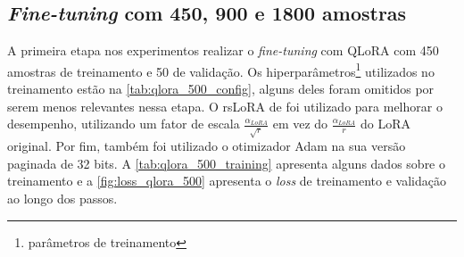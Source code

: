 \subsection{\textit{Fine-tuning} com 450, 900 e 1800 amostras}


A primeira etapa nos experimentos realizar o \textit{fine-tuning} com \ac{QLoRA} com 450 amostras de treinamento e 50 de validação. Os hiperparâmetros\footnote{parâmetros
    de treinamento} utilizados no treinamento estão na \autoref{tab:qlora_500_config}, alguns deles foram omitidos por serem menos relevantes nessa etapa. O \ac{rsLoRA} de
\textcite{kalajdzievski2023rank} foi utilizado para melhorar o desempenho, utilizando um fator de escala \begin{math}\frac{\alpha_{LoRA}}{\sqrt{r}}\end{math} em vez do
\begin{math}\frac{\alpha_{LoRA}}{r}\end{math} do \ac{LoRA} original. Por fim, também foi utilizado o otimizador \ac{Adam} na sua versão paginada de 32 bits. A
\autoref{tab:qlora_500_training} apresenta alguns dados sobre o treinamento e a \autoref{fig:loss_qlora_500} apresenta o \textit{loss} de treinamento e validação ao
longo dos passos.

